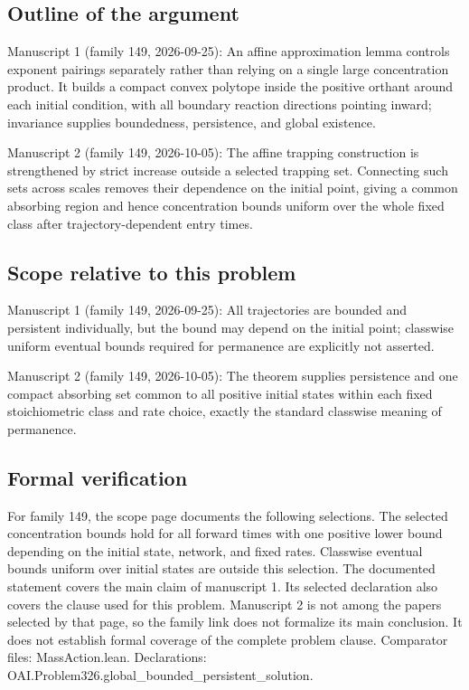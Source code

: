 \documentclass[11pt]{article}
\begin{document}
\subsection{Outline of the argument}
Manuscript 1 (family 149, 2026-09-25): An affine approximation lemma controls exponent pairings separately rather than relying on a single large concentration product. It builds a compact convex polytope inside the positive orthant around each initial condition, with all boundary reaction directions pointing inward; invariance supplies boundedness, persistence, and global existence.

Manuscript 2 (family 149, 2026-10-05): The affine trapping construction is strengthened by strict increase outside a selected trapping set. Connecting such sets across scales removes their dependence on the initial point, giving a common absorbing region and hence concentration bounds uniform over the whole fixed class after trajectory-dependent entry times.

\subsection{Scope relative to this problem}
Manuscript 1 (family 149, 2026-09-25): All trajectories are bounded and persistent individually, but the bound may depend on the initial point; classwise uniform eventual bounds required for permanence are explicitly not asserted.

Manuscript 2 (family 149, 2026-10-05): The theorem supplies persistence and one compact absorbing set common to all positive initial states within each fixed stoichiometric class and rate choice, exactly the standard classwise meaning of permanence.

\subsection{Formal verification}
For family 149, the scope page documents the following selections. The selected concentration bounds hold for all forward times with one positive lower bound depending on the initial state, network, and fixed rates. Classwise eventual bounds uniform over initial states are outside this selection. The documented statement covers the main claim of manuscript 1. Its selected declaration also covers the clause used for this problem. Manuscript 2 is not among the papers selected by that page, so the family link does not formalize its main conclusion. It does not establish formal coverage of the complete problem clause. Comparator files: MassAction.lean. Declarations: OAI.Problem326.global\_bounded\_persistent\_solution.
\end{document}
